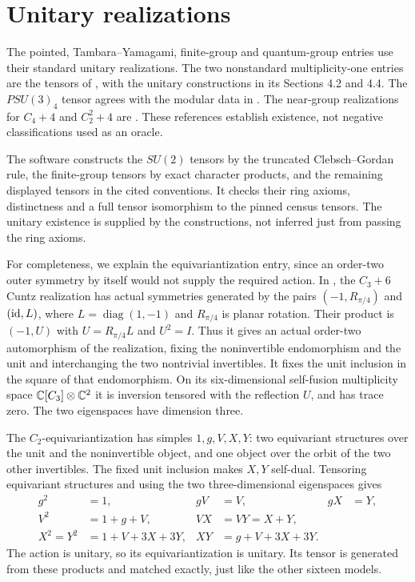 \section{Unitary realizations}\label{sec:models}

The pointed, Tambara--Yamagami, finite-group and quantum-group entries
use their standard unitary realizations. The two nonstandard
multiplicity-one entries are the tensors of \cite[Section 3.5]{LPR},
with the unitary constructions in its Sections 4.2 and 4.4. The
$PSU(3)_4$ tensor agrees with the modular data in \cite{HR}.
The near-group realizations for $C_4+4$ and $C_2^2+4$ are
\cite[Examples 9.5--9.6]{Izumi}. These references establish existence,
not negative classifications used as an oracle.

The software constructs the $SU(2)$ tensors by the truncated
Clebsch--Gordan rule, the finite-group tensors by exact character
products, and the remaining displayed tensors in the cited conventions.
It checks their ring axioms, distinctness and a full tensor isomorphism
to the pinned census tensors. The unitary existence is supplied by the
constructions, not inferred just from passing the ring axioms.

For completeness, we explain the equivariantization entry, since an
order-two outer symmetry by itself would not supply the required action.
In \cite[Example 13.10]{Izumi}, the $C_3+6$ Cuntz realization has actual
symmetries generated by the pairs $(-1,R_{\pi/4})$ and
$(\operatorname{id},L)$, where $L=\operatorname{diag}(1,-1)$ and $R_{\pi/4}$ is planar
rotation. Their product is $(-1,U)$ with $U=R_{\pi/4}L$ and $U^2=I$.
Thus it gives an actual order-two automorphism of the realization,
fixing the noninvertible endomorphism and the unit and interchanging
the two nontrivial invertibles. It fixes the unit inclusion in the square
of that endomorphism. On its six-dimensional self-fusion multiplicity
space $\mathbb C[C_3]\otimes\mathbb C^2$ it is inversion tensored with the
reflection $U$, and has trace zero. The two eigenspaces have dimension
three.

The $C_2$-equivariantization has simples $1,g,V,X,Y$:
two equivariant structures over the unit and the noninvertible object,
and one object over the orbit of the two other invertibles. The fixed
unit inclusion makes $X,Y$ self-dual. Tensoring equivariant structures
and using the two three-dimensional eigenspaces gives
\begin{align*}
 g^2&=1,&gV&=V,&gX&=Y,\\
 V^2&=1+g+V,&VX&=VY=X+Y,\\
 X^2=Y^2&=1+V+3X+3Y,&XY&=g+V+3X+3Y.
\end{align*}
The action is unitary, so its equivariantization is unitary. Its tensor
is generated from these products and matched exactly, just like the
other sixteen models.
